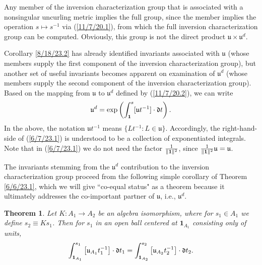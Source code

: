 \documentclass{amsart}
\numberwithin{equation}{section}
\newtheorem{theorem}{Theorem}
\theoremstyle{definition}
\numberwithin{theorem}{section}
\begin{document}
Any member of the inversion characterization group that is associated with a nonsingular uncurling metric implies the full group, since the member implies the operation $s\mapsto s^{-1}$ via (\ref{11/7/20.1}), from which the full inversion characterization group can be computed.  Obviously, this group is not the direct product $\mathfrak{u}\times\mathfrak{u}^d$. 

Corollary \ref{8/18/23.2} has already identified invariants associated with $\mathfrak{u}$ (whose members supply the first component of the inversion characterization group), but another set of useful invariants becomes apparent on examination of $\mathfrak{u}^d$ (whose members supply the second component of the inversion characterization group).  Based on the mapping from $\mathfrak{u}$ to $\mathfrak{u}^d$ defined by (\ref{11/7/20.2}),  we can write \begin{equation}  \mathfrak{u}^d = \exp\left(\int_{\bf 1}^s [\mathfrak{u}t^{-1}]\cdot \mathfrak{d}t\right). \label{6/7/23.1}\end{equation}  In the above, the notation $\mathfrak{u}t^{-1}$ means $\{Lt^{-1}: L\in \mathfrak{u}\}$.  Accordingly, the right-hand-side of (\ref{6/7/23.1}) is understood to be a collection of exponentiated integrals.   Note that in (\ref{6/7/23.1}) we do not need the factor $\frac{1}{\|{\bf 1}\|^2}$, since $\frac{1}{\|{\bf 1}\|^2}\mathfrak{u}=\mathfrak{u}$.  

The invariants stemming from the $\mathfrak{u}^d$ contribution to the inversion characterization group proceed from the following simple corollary of Theorem \ref{6/6/23.1}, which we will give ``co-equal status" as a theorem because it ultimately addresses the co-important  partner of $\mathfrak{u}$, i.e., $\mathfrak{u}^d$. 

\begin{theorem}\label{6/6/23.2} Let $K:A_1\rightarrow A_2$ be an algebra isomorphism, where for $s_1\in A_1$ we define $s_2\equiv Ks_1$.  Then for $s_1$ in an open ball centered at $\mathbf{1}_{A_1}$ consisting only of units, \begin{equation}\label{9/6/24.2} \int_{{\bf 1}_{A_1}}^{s_1} \left[\mathfrak{u}_{A_1}t_1^{-1}\right]\cdot \mathfrak{d}t_1 
= \int_{{\bf 1}_{A_2}}^{s_2} \left[\mathfrak{u}_{A_2}t_2^{-1}\right]\cdot \mathfrak{d}t_2 . \end{equation} \end{theorem}
\end{document}
